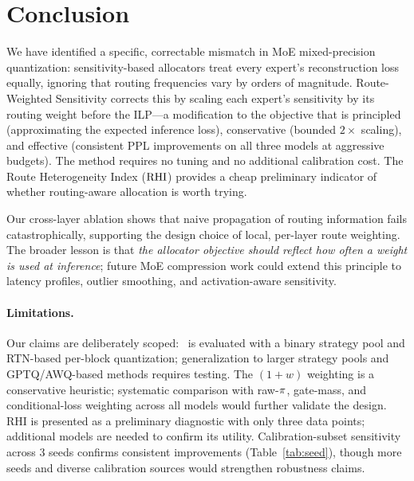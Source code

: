 \section{Conclusion}

We have identified a specific, correctable mismatch in MoE mixed-precision quantization: sensitivity-based allocators treat every expert's reconstruction loss equally, ignoring that routing frequencies vary by orders of magnitude. Route-Weighted Sensitivity corrects this by scaling each expert's sensitivity by its routing weight before the ILP---a modification to the objective that is principled (approximating the expected inference loss), conservative (bounded $2\times$ scaling), and effective (consistent PPL improvements on all three models at aggressive budgets). The method requires no tuning and no additional calibration cost. The Route Heterogeneity Index ($\mathrm{RHI}$) provides a cheap preliminary indicator of whether routing-aware allocation is worth trying.

Our cross-layer ablation shows that naive propagation of routing information fails catastrophically, supporting the design choice of local, per-layer route weighting. The broader lesson is that \emph{the allocator objective should reflect how often a weight is used at inference}; future MoE compression work could extend this principle to latency profiles, outlier smoothing, and activation-aware sensitivity.

\paragraph{Limitations.}
Our claims are deliberately scoped: \method\ is evaluated with a binary strategy pool and RTN-based per-block quantization; generalization to larger strategy pools and GPTQ/AWQ-based methods requires testing. The $(1 + w)$ weighting is a conservative heuristic; systematic comparison with raw-$\pi$, gate-mass, and conditional-loss weighting across all models would further validate the design. RHI is presented as a preliminary diagnostic with only three data points; additional models are needed to confirm its utility. Calibration-subset sensitivity across 3 seeds confirms consistent improvements (Table~\ref{tab:seed}), though more seeds and diverse calibration sources would strengthen robustness claims.
